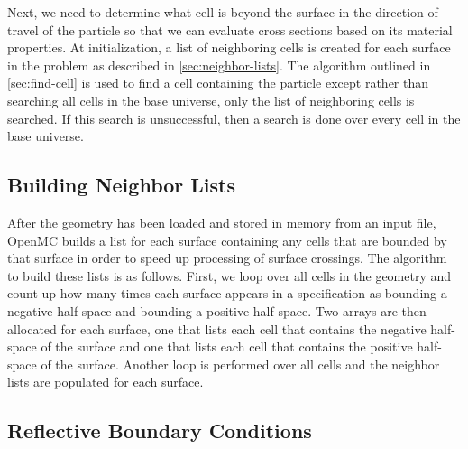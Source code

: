 Next, we need to determine what cell is beyond the surface in the direction of
travel of the particle so that we can evaluate cross sections based on its
material properties. At initialization, a list of neighboring cells is created
for each surface in the problem as described in
\autoref{sec:neighbor-lists}. The algorithm outlined in \autoref{sec:find-cell}
is used to find a cell containing the particle except rather than searching all
cells in the base universe, only the list of neighboring cells is searched. If
this search is unsuccessful, then a search is done over every cell in the base
universe.

\subsection{Building Neighbor Lists}
\label{sec:neighbor-lists}

After the geometry has been loaded and stored in memory from an input file,
OpenMC builds a list for each surface containing any cells that are bounded by
that surface in order to speed up processing of surface crossings. The algorithm
to build these lists is as follows. First, we loop over all cells in the
geometry and count up how many times each surface appears in a specification as
bounding a negative half-space and bounding a positive half-space. Two arrays
are then allocated for each surface, one that lists each cell that contains the
negative half-space of the surface and one that lists each cell that contains
the positive half-space of the surface. Another loop is performed over all cells
and the neighbor lists are populated for each surface.

\subsection{Reflective Boundary Conditions}
\label{sec:reflection}

